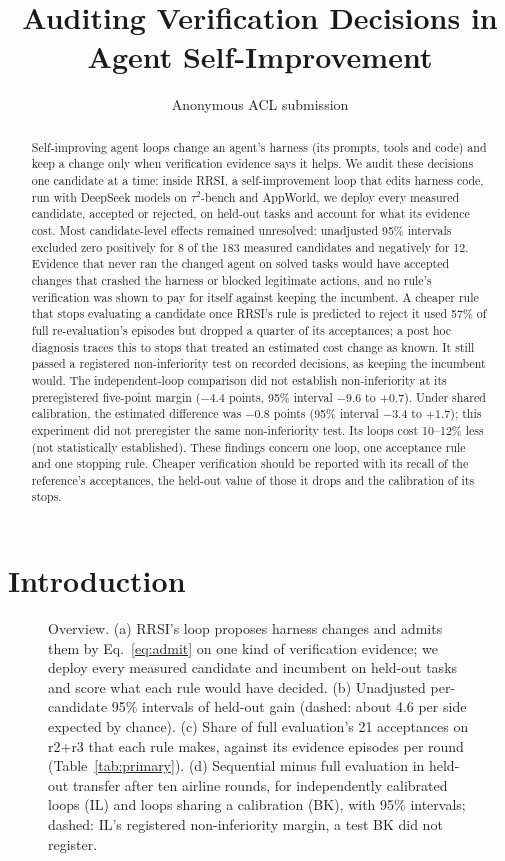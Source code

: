 \documentclass[11pt]{article}
\title{Auditing Verification Decisions in Agent Self-Improvement}
\author{Anonymous ACL submission}
\begin{document}
\maketitle

\begin{abstract}
Self-improving agent loops change an agent's harness (its prompts, tools and code) and keep a change only when verification evidence says it helps. We audit these decisions one candidate at a time: inside RRSI, a self-improvement loop that edits harness code, run with DeepSeek models on $\tau^2$-bench and AppWorld, we deploy every measured candidate, accepted or rejected, on held-out tasks and account for what its evidence cost. Most candidate-level effects remained unresolved: unadjusted 95\% intervals excluded zero positively for 8 of the 183 measured candidates and negatively for 12. Evidence that never ran the changed agent on solved tasks would have accepted changes that crashed the harness or blocked legitimate actions, and no rule's verification was shown to pay for itself against keeping the incumbent. A cheaper rule that stops evaluating a candidate once RRSI's rule is predicted to reject it used 57\% of full re-evaluation's episodes but dropped a quarter of its acceptances; a post hoc diagnosis traces this to stops that treated an estimated cost change as known. It still passed a registered non-inferiority test on recorded decisions, as keeping the incumbent would. The independent-loop comparison did not establish non-inferiority at its preregistered five-point margin ($-4.4$ points, 95\% interval $-9.6$ to $+0.7$). Under shared calibration, the estimated difference was $-0.8$ points (95\% interval $-3.4$ to $+1.7$); this experiment did not preregister the same non-inferiority test. Its loops cost 10--12\% less (not statistically established). These findings concern one loop, one acceptance rule and one stopping rule. Cheaper verification should be reported with its recall of the reference's acceptances, the held-out value of those it drops and the calibration of its stops.
\end{abstract}

\section{Introduction}

\begin{figure}[t]
\centering

\caption{Overview. (a) RRSI's loop proposes harness changes and admits them by Eq.~\ref{eq:admit} on one kind of verification evidence; we deploy every measured candidate and incumbent on held-out tasks and score what each rule would have decided. (b) Unadjusted per-candidate 95\% intervals of held-out gain (dashed: about 4.6 per side expected by chance). (c) Share of full evaluation's 21 acceptances on r2+r3 that each rule makes, against its evidence episodes per round (Table~\ref{tab:primary}). (d) Sequential minus full evaluation in held-out transfer after ten airline rounds, for independently calibrated loops (IL) and loops sharing a calibration (BK), with 95\% intervals; dashed: IL's registered non-inferiority margin, a test BK did not register.}
\label{fig:overview}
\end{figure}
\end{document}

